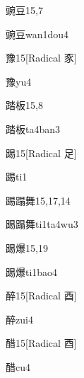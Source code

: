 \begin{entry}{豌豆}{15,7}
  \begin{phonetics}{豌豆}{wan1dou4}
  \end{phonetics}
\end{entry}

\begin{entry}{豫}{15}[Radical 豕]
  \begin{phonetics}{豫}{yu4}
  \end{phonetics}
\end{entry}

\begin{entry}{踏板}{15,8}
  \begin{phonetics}{踏板}{ta4ban3}
  \end{phonetics}
\end{entry}

\begin{entry}{踢}{15}[Radical 足]
  \begin{phonetics}{踢}{ti1}
  \end{phonetics}
\end{entry}

\begin{entry}{踢蹋舞}{15,17,14}
  \begin{phonetics}{踢蹋舞}{ti1ta4wu3}
  \end{phonetics}
\end{entry}

\begin{entry}{踢爆}{15,19}
  \begin{phonetics}{踢爆}{ti1bao4}
  \end{phonetics}
\end{entry}

\begin{entry}{醉}{15}[Radical 酉]
  \begin{phonetics}{醉}{zui4}
  \end{phonetics}
\end{entry}

\begin{entry}{醋}{15}[Radical ⾣]
  \begin{phonetics}{醋}{cu4}
  \end{phonetics}
\end{entry}

